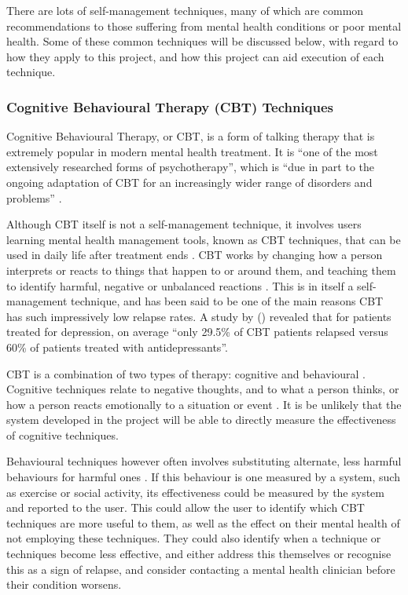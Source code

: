 \documentclass[11pt,openright,a4paper]{report}
\begin{document}
There are lots of self-management techniques, many of which are common recommendations to those suffering from mental health conditions or poor mental health. Some of these common techniques will be discussed below, with regard to how they apply to this project, and how this project can aid execution of each technique.

\subsubsection{Cognitive Behavioural Therapy (CBT) Techniques}
Cognitive Behavioural Therapy, or CBT, is a form of talking therapy that is extremely popular in modern mental health treatment. It is \enquote{one of the most extensively researched forms of psychotherapy}, which is \enquote{due in part to the ongoing adaptation of CBT for an increasingly
wider range of disorders and problems} \parencite{butler2006empirical}.

Although CBT itself is not a self-management technique, it involves users learning mental health management tools, known as CBT techniques, that can be used in daily life after treatment ends \parencite{babcpcbt}. CBT works by changing how a person interprets or reacts to things that happen to or around them, and teaching them to identify harmful, negative or unbalanced reactions \parencite{nhscbt}. This is in itself a self-management technique, and has been said to be one of the main reasons CBT has such impressively low relapse rates. A study by \citeauthor{butler2006empirical} (\citeyear{butler2006empirical}) revealed that for patients treated for depression, on average \enquote{only 29.5\% of CBT patients relapsed versus 60\% of patients treated with antidepressants}.

CBT is a combination of two types of therapy: cognitive and behavioural \parencite{patientcbt}. Cognitive techniques relate to negative thoughts, and to what a person thinks, or how a person reacts emotionally to a situation or event \parencite{medscapecbt}. It is be unlikely that the system developed in the project will be able to directly measure the effectiveness of cognitive techniques.

Behavioural techniques however often involves substituting alternate, less harmful behaviours for harmful ones \parencite{patientcbt}. If this behaviour is one measured by a system, such as exercise or social activity, its effectiveness could be measured by the system and reported to the user. This could allow the user to identify which CBT techniques are more useful to them, as well as the effect on their mental health of not employing these techniques. They could also identify when a technique or techniques become less effective, and either address this themselves or recognise this as a sign of relapse, and consider contacting a mental health clinician before their condition worsens.
\end{document}
